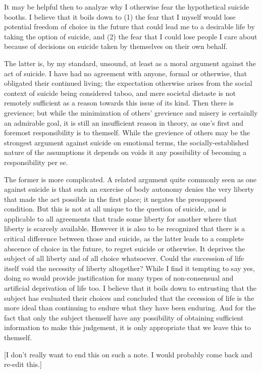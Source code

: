 \documentclass{scrartcl}
\begin{document}
It may be helpful then to analyze why I otherwise fear the hypothetical
suicide booths. I believe that it boils down to (1) the fear that I
myself would lose potential freedom of choice in the future that could
lead me to a desirable life by taking the option of suicide, and (2) the
fear that I could lose people I care about because of decisions on
suicide taken by themselves on their own behalf.

The latter is, by my standard, unsound, at least as a moral argument
against the act of suicide. I have had no agreement with anyone,
formal or otherwise, that obligated their continued living; the
expectation otherwise arises from the social context of suicide being
considered taboo, and mere societal distaste is not remotely
sufficient as a reason towards this issue of its kind. Then there is
grevience; but while the minimization of others' grevience and misery is
certainlly an admirable goal, it is still an insufficient reason in
theory, as one's first and foremost responsibility is to themself. While
the grevience of others may be the strongest argument against suicide on
emotional terms, the socially-established nature of the assumptions it
depends on voids it any possibility of becoming a responsibility per se.

The former is more complicated. A related argument quite commonly seen
as one against suicide is that such an exercise of body autonomy denies
the very liberty that made the act possible in the first place; it
negates the presupposed condition. But this is not at all unique to the
question of suicide, and is applicable to all agreements that trade
some liberty for another where that liberty is scarcely available.
However it is also to be recognized that there is a critical difference
between those and suicide, as the latter leads to a complete abscence of
choice in the future, to regret suicide or otherwise. It deprives the
subject of all liberty and of all choice whatsoever. Could the
succession of life itself void the necessity of liberty altogether?
While I find it tempting to say yes, doing so would provide
justification for many types of non-consensual and artificial
deprivation of life too. I believe that it boils down to entrusting that
the subject has evaluated their choices and concluded that the cecession
of life is the more ideal than continuing to endure what they have been
enduring. And for the fact that only the subject themself have any
possibility of obtaining sufficient information to make this judgement,
it is only appropriate that we leave this to themself.

[I don't really want to end this on such a note. I would probably come
back and re-edit this.]
\end{document}
